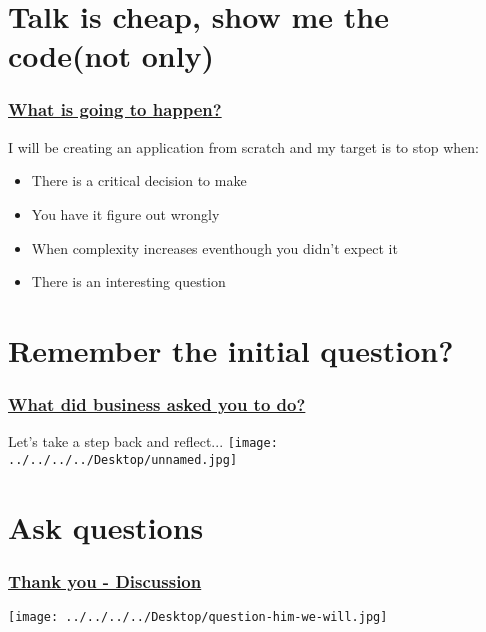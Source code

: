 \documentclass{beamer}
\begin{document}
\section{Talk is cheap, show me the code(not only)}
\begin{frame}
	\frametitle{\underline{What is going to happen?}}
	I will be creating an application from scratch and my target is to stop when:
	\begin{itemize}
		\item There is a critical decision to make
		\item You have it figure out wrongly
		\item When complexity increases eventhough you didn't expect it
		\item There is an interesting question
	\end{itemize}	
\end{frame}

\section{Remember the initial question?}
\begin{frame}
	\frametitle{\underline{What did business asked you to do?}}
	Let's take a step back and reflect...
	\texttt{[image: ../../../../Desktop/unnamed.jpg]}
\end{frame}

\section{Ask questions}
\begin{frame}
	\frametitle{\underline{Thank you - Discussion}}
	\begin{center}
		\texttt{[image: ../../../../Desktop/question-him-we-will.jpg]}
	\end{center}
	 
\end{frame}
\end{document}
